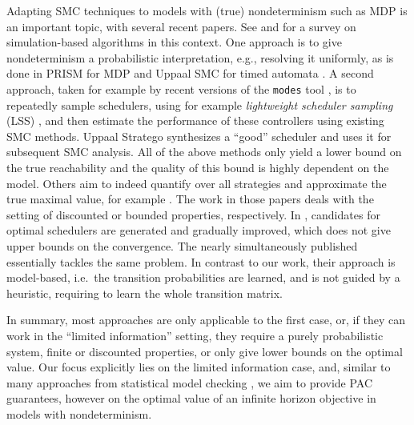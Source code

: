 \documentclass{theoretics}
\begin{document}
Adapting SMC techniques to models with (true) nondeterminism such as MDP is an important topic, with several recent papers.
See \cite{chang2013simulation,DBLP:journals/jmlr/StrehlLL09} and \cite[Chapter~4.1.5]{DBLP:phd/dnb/Weininger22} for a survey on simulation-based algorithms in this context.
One approach is to give nondeterminism a probabilistic interpretation, e.g., resolving it uniformly, as is done in PRISM for MDP \cite{DBLP:conf/cav/KwiatkowskaNP11} and Uppaal SMC for timed automata \cite{DBLP:conf/cav/DavidLLMW11,DBLP:conf/formats/DavidLLMPVW11,DBLP:conf/ifm/Larsen13}.
A second approach, taken for example by recent versions of the \texttt{modes} tool \cite{DBLP:conf/tacas/HartmannsH14,DBLP:conf/isola/DArgenioHS18,DBLP:conf/tacas/BuddeDHS18}, is to repeatedly sample schedulers, using for example \emph{lightweight scheduler sampling} (LSS) \cite{DBLP:conf/sefm/LegayST14,DBLP:journals/sttt/DArgenioLST15}, and then estimate the performance of these controllers using existing SMC methods.
Uppaal Stratego \cite{DBLP:conf/tacas/DavidJLMT15} synthesizes a \enquote{good} scheduler and uses it for subsequent SMC analysis.
All of the above methods only yield a lower bound on the true reachability and the quality of this bound is highly dependent on the model.
Others aim to indeed quantify over all strategies and approximate the true maximal value, for example \cite{DBLP:journals/sttt/LassaigneP15,DBLP:conf/qest/HenriquesMZPC12}.
The work in those papers deals with the setting of discounted or bounded properties, respectively.
In \cite{DBLP:conf/qest/HenriquesMZPC12}, candidates for optimal schedulers are generated and gradually improved, which does not give upper bounds on the convergence.
The nearly simultaneously published \cite{DBLP:conf/rss/FuT14} essentially tackles the same problem.
In contrast to our work, their approach is model-based, i.e.\ the transition probabilities are learned, and is not guided by a heuristic, requiring to learn the whole transition matrix.

In summary, most approaches are only applicable to the first case, or, if they can work in the \enquote{limited information} setting, they require a purely probabilistic system, finite or discounted properties, or only give lower bounds on the optimal value.
Our focus explicitly lies on the limited information case, and, similar to many approaches from statistical model checking \cite{DBLP:conf/cav/YounesS02,DBLP:conf/vmcai/HeraultLMP04,DBLP:conf/cav/SenVA04,DBLP:conf/rss/FuT14}, we aim to provide PAC guarantees, however on the optimal value of an infinite horizon objective in models with nondeterminism.
\end{document}
